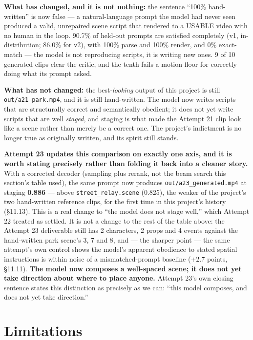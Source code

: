 \documentclass[11pt]{article}
\newcommand{\secsym}{\S}
\begin{document}
\textbf{What has changed, and it is not nothing:} the sentence ``100\%
hand-written'' is now false --- a natural-language prompt the model had
never seen produced a valid, unrepaired scene script that rendered to a
USABLE video with no human in the loop. 90.7\% of held-out prompts are
satisfied completely (v1, in-distribution; 86.0\% for v2), with 100\%
parse and 100\% render, and 0\% exact-match --- the model is not
reproducing scripts, it is writing new ones. 9 of 10 generated clips
clear the critic, and the tenth fails a motion floor for correctly doing
what its prompt asked.

\textbf{What has not changed:} the best-\emph{looking} output of this
project is still \texttt{out/a21\_park.mp4}, and it is still
hand-written. The model now writes scripts that are structurally correct
and semantically obedient; it does not yet write scripts that are well
\emph{staged}, and staging is what made the Attempt 21 clip look like a
scene rather than merely be a correct one. The project's indictment is no
longer true as originally written, and its spirit still stands.

\textbf{Attempt 23 updates this comparison on exactly one axis, and it is
worth stating precisely rather than folding it back into a cleaner
story.} With a corrected decoder (sampling plus rerank, not the beam
search this section's table used), the same prompt now produces
\texttt{out/a23\_generated.mp4} at staging \textbf{0.886} --- above
\texttt{street\_relay.scene} (0.825), the weaker of the project's two
hand-written reference clips, for the first time in this project's
history (\secsym11.13). This is a real change to ``the model does not
stage well,'' which Attempt 22 treated as settled. It is not a change to
the rest of the table above: the Attempt 23 deliverable still has 2
characters, 2 props and 4 events against the hand-written park scene's
3, 7 and 8, and --- the sharper point --- the same attempt's own control
shows the model's apparent obedience to stated spatial instructions is
within noise of a mismatched-prompt baseline ($+2.7$ points,
\secsym11.11). \textbf{The model now composes a well-spaced scene; it
does not yet take direction about where to place anyone.} Attempt 23's
own closing sentence states this distinction as precisely as we can:
``this model composes, and does not yet take direction.''

\section{Limitations}
\label{sec:limitations}
\end{document}
